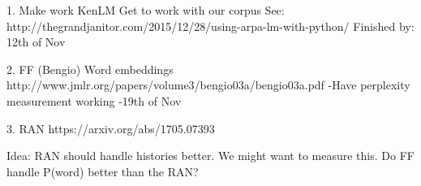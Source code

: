 

1. Make  work KenLM
Get to work with our corpus
See: http://thegrandjanitor.com/2015/12/28/using-arpa-lm-with-python/
Finished by: 12th of Nov

2. FF (Bengio)
Word embeddings
http://www.jmlr.org/papers/volume3/bengio03a/bengio03a.pdf
-Have perplexity measurement working
-19th of Nov

3. RAN
https://arxiv.org/abs/1705.07393


Idea:
RAN should handle histories better. We might want to measure this.
Do FF handle P(word) better than the RAN?
